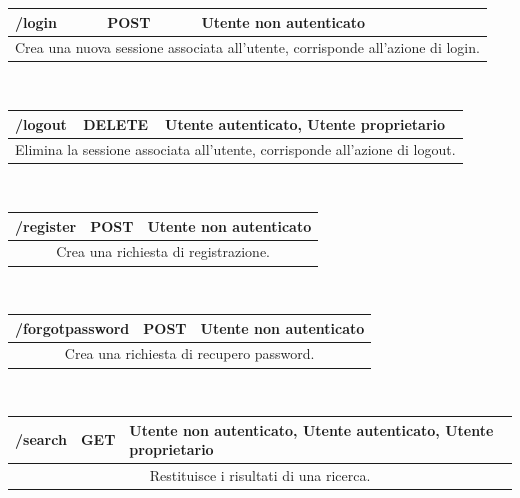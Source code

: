\begin{table}[h]
	\begin{tabular}{|p{}|p{}|p{}|}
		\toprule
		\textbf{/login}	& \textbf{POST} & \textbf{Utente non autenticato} \\ \midrule
		\multicolumn{3}{|c|}{Crea una nuova sessione associata all'utente, corrisponde all'azione di login.} \\
		\bottomrule
	\end{tabular}\\
	\par\bigskip
	
	\begin{tabular}{|p{}|p{}|p{}|}
		\toprule
		\textbf{/logout} & \textbf{DELETE} & \textbf{Utente autenticato, Utente proprietario} \\ \midrule
		\multicolumn{3}{|c|}{Elimina la sessione associata all'utente, corrisponde all'azione di logout.} \\
		\bottomrule
	\end{tabular}\\
	\par\bigskip
	
	\begin{tabular}{|p{}|p{}|p{}|}
		\toprule
		\textbf{/register} & \textbf{POST} & \textbf{Utente non autenticato} \\ \midrule
		\multicolumn{3}{|c|}{Crea una richiesta di registrazione.} \\
		\bottomrule
	\end{tabular}\\
	\par\bigskip
	
	\begin{tabular}{|p{}|p{}|p{}|}
		\toprule
		\textbf{/forgotpassword} & \textbf{POST} & \textbf{Utente non autenticato} \\ \midrule
		\multicolumn{3}{|c|}{Crea una richiesta di recupero password.} \\
		\bottomrule
	\end{tabular}\\
	\par\bigskip
	
	\begin{tabular}{|p{}|p{}|p{}|}
		\toprule
		\textbf{/search} & \textbf{GET} & \textbf{Utente non autenticato, Utente autenticato, Utente proprietario} \\ \midrule
		\multicolumn{3}{|c|}{Restituisce i risultati di una ricerca.} \\
		\bottomrule
	\end{tabular}\\
	\par\bigskip
	

\end{table}
